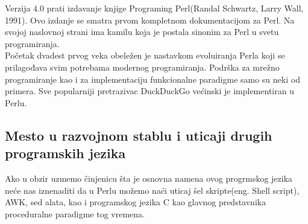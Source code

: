 \documentclass[a4paper]{article}
\begin{document}
Verzija 4.0 prati izdavanje knjige Programing Perl(Randal Schwartz, Larry Wall, 1991). Ovo izdanje se smatra prvom kompletnom dokumentacijom za Perl. Na svojoj naslovnoj strani ima kamilu koja je postala sinonim za Perl u svetu programiranja\cite{perlOrg}.\\

Početak dvadest prvog veka obeležen je nastavkom evoluiranja Perla koji se prilagođava svim potrebama modernog programiranja. Podrška za mrežno programiranje kao i za implementaciju funkcionalne paradigme samo su neki od primera. Sve popularniji pretrazivac DuckDuckGo većinski je implementiran u Perlu\cite{duck}.

\subsection{Mesto u razvojnom stablu i uticaji drugih programskih jezika}



Ako u obzir uzmemo činjenicu šta je osnovna namena ovog progrmskog jezika neće nas iznenaditi da u  Perlu možemo naći uticaj šel skripte(eng. Shell script), AWK, sed alata, kao i programskog jezika C kao glavnog predstavnika proceduralne paradigme tog vremena.\cite{friedl2006mastering}\\
\end{document}
